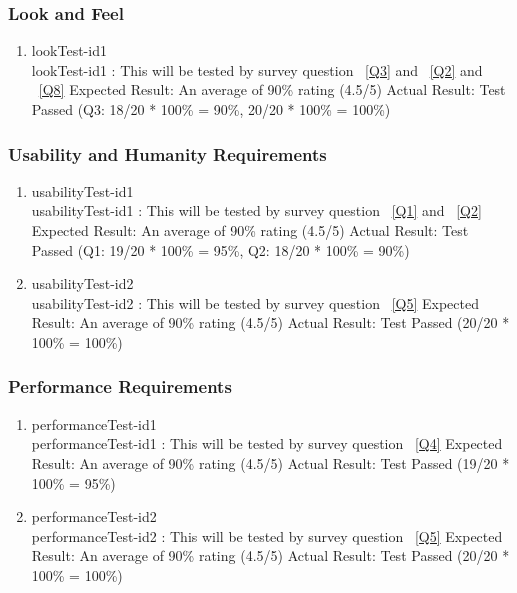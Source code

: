 \documentclass[12pt, titlepage]{article}
\begin{document}
\subsubsection{Look and Feel}
\begin{enumerate}
\item{lookTest-id1\\}
lookTest-id1 : This will be tested by survey question ~\ref{Q3} and ~\ref{Q2} and ~\ref{Q8}
\newline
	Expected Result: An average of 90\% rating (4.5/5)
\newline
	Actual Result: Test Passed (Q3: 18/20 * 100\% = 90\%, 20/20 * 100\% = 100\%)
\end{enumerate}

\subsubsection{Usability and Humanity Requirements}
\begin{enumerate}
\item{usabilityTest-id1\\}
usabilityTest-id1 : This will be tested by survey question ~\ref{Q1} and ~\ref{Q2}
\newline
	Expected Result: An average of 90\% rating (4.5/5)
\newline
	Actual Result: Test Passed (Q1: 19/20 * 100\% = 95\%, Q2: 18/20 * 100\% = 90\%)

\item{usabilityTest-id2\\}
usabilityTest-id2 : This will be tested by survey question ~\ref{Q5}
\newline
	Expected Result: An average of 90\% rating (4.5/5)
\newline
	Actual Result: Test Passed (20/20 * 100\% = 100\%)
\end{enumerate}

\subsubsection{Performance Requirements}
\begin{enumerate}
\item{performanceTest-id1\\}
performanceTest-id1 : This will be tested by survey question ~\ref{Q4}
\newline
	Expected Result: An average of 90\% rating (4.5/5)
\newline
	Actual Result: Test Passed (19/20 * 100\% = 95\%)

\item{performanceTest-id2\\}
performanceTest-id2 : This will be tested by survey question ~\ref{Q5}
\newline
	Expected Result: An average of 90\% rating (4.5/5)
\newline
	Actual Result: Test Passed (20/20 * 100\% = 100\%)
\end{enumerate}
\end{document}
